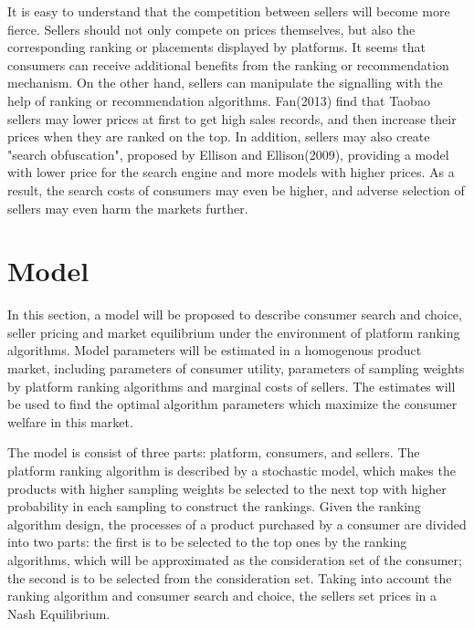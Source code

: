 \documentclass{article}
\begin{document}
It is easy to understand that the competition between sellers will become more fierce. Sellers should not only compete on prices themselves, but also the corresponding ranking or placements displayed by platforms. It seems that consumers can receive additional benefits from the ranking or recommendation mechanism. On the other hand, sellers can manipulate the signalling with the help of ranking or recommendation algorithms. Fan(2013) find that Taobao sellers may lower prices at first to get high sales records, and then increase their prices when they are ranked on the top. In addition, sellers may also create "search obfuscation", proposed by Ellison and Ellison(2009), providing a model with lower price for the search engine and more models with higher prices. As a result, the search costs of consumers may even be higher, and adverse selection of sellers may even harm the markets further. 

\section{Model}

In this section, a model will be proposed to describe consumer search and choice, seller pricing and market equilibrium under the environment of platform ranking algorithms. Model parameters will be estimated in a homogenous product market, including parameters of consumer utility, parameters of sampling weights by platform ranking algorithms and marginal costs of sellers. The estimates will be used to find the optimal algorithm parameters which maximize the consumer welfare in this market.  

The model is consist of three parts: platform, consumers, and sellers. The platform ranking algorithm is described by a stochastic model, which makes the products with higher sampling weights be selected to the next top with higher probability in each sampling to construct the rankings. Given the ranking algorithm design, the processes of a product purchased by a consumer are divided into two parts: the first is to be selected to the top ones by the ranking algorithms, which will be approximated as the consideration set of the consumer; the second is to be selected from the consideration set. Taking into account the ranking algorithm and consumer search and choice, the sellers set prices in a Nash Equilibrium. 

\end{document}
